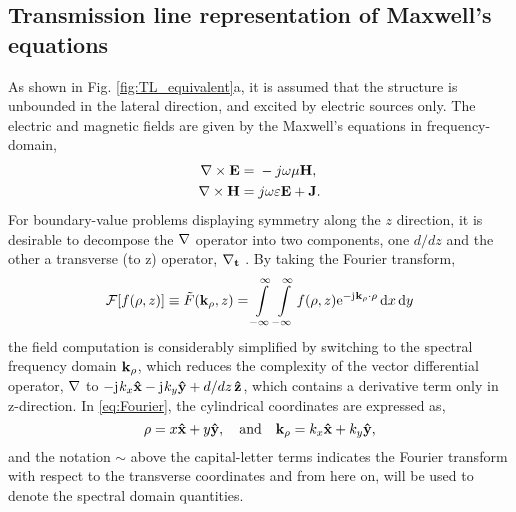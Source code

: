 \documentclass[12pt]{article}
\begin{document}
\subsection{Transmission line representation of Maxwell's equations}
%
As shown in Fig. \ref{fig:TL_equivalent}a, it is assumed that the structure is unbounded in the lateral direction, and excited by electric sources only. The electric and magnetic fields are given by the Maxwell's equations in frequency-domain,
%
\begin{subequations}
  \begin{align}
    \nabla \times{\mathbf{E}} ={}& -j \omega \mu \mathbf{H},
    \label{eq:E}\\
    \nabla \times{\mathbf{H}} ={}& j \omega \varepsilon \mathbf{E} + \mathbf{J}.
    \label{eq:H}
  \end{align}
  \label{eq:MaxE}%
\end{subequations}
%
For boundary-value problems displaying symmetry along the $z$ direction, it is desirable to decompose the $\mathbf{\nabla}$ operator into two components, one $d/dz$ and the other a transverse (to z) operator, $\mathbf{\nabla_t}$ \cite[p. 64]{felsen1994}. By taking the Fourier transform,
%
\begin{equation}
  \mathcal{F}[f(\mathbf{\rho},z)] \equiv \tilde{F}(\mathbf{k}_{\rho},z) = \int\limits_{-\infty}^\infty \int\limits_{-\infty}^\infty
  f(\mathbf{\rho},z) \mathrm{e}^{-\mathrm{j}\mkern1mu \mathbf{k}_{\rho} \cdot \mathbf{\rho}} \mathop{}\!\mathrm{d}{x} \mathop{}\!\mathrm{d}{y}
  \label{eq:Fourier}
\end{equation}
%
the field computation is considerably simplified by switching to the spectral frequency domain $\mathbf{k_{\rho}}$, which reduces the complexity of the vector differential operator, $\mathbf{\nabla}$ to $-\mathrm{j}\mkern1mu k_x \mathbf{\hat{x}} - \mathrm{j}\mkern1mu k_y \mathbf{\hat{y}} + d/dz\, \mathbf{\hat{z}}$, which contains a derivative term only in z-direction. In \eqref{eq:Fourier}, the cylindrical coordinates are expressed as,
%
\begin{equation}
  \mathbf{\rho} = x\mathbf{\hat{x}} + y\mathbf{\hat{y}}, \quad \text{and} \quad
  \mathbf{k_{\rho}} = k_x\mathbf{\hat{x}} + k_y\mathbf{\hat{y}},
  \label{eq:rect2cylindrical}
\end{equation}
%
and the notation $\sim$ above the capital-letter terms indicates the Fourier transform with respect to the transverse coordinates and from here on, will be used to denote the spectral domain quantities.
\end{document}
